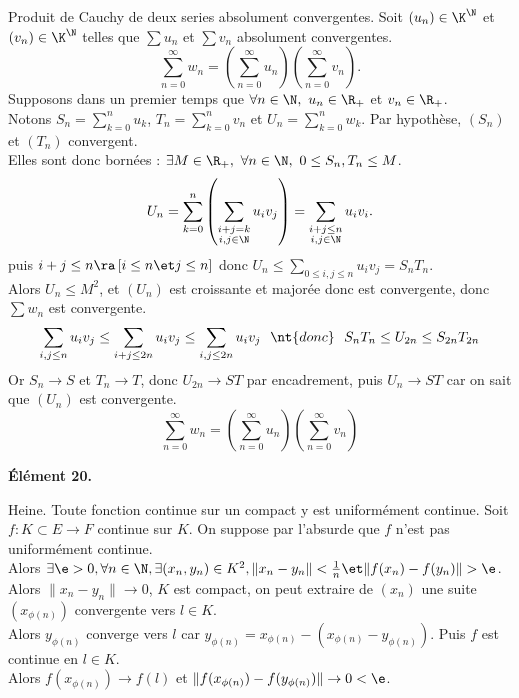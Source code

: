 \documentclass[11pt]{article}
\begin{document}
\begin{prop}{Produit de Cauchy de deux series absolument convergentes.}{}
    Soit $(u_n)\in\K^\N$ et $(v_n)\in\K^\N$ telles que $\sum u_n$ et $\sum v_n$ absolument convergentes.
    \begin{equation*}
        \sum_{n=0}^{\infty} w_n = \left( \sum_{n=0}^{\infty} u_n \right) \left( \sum_{n=0}^{\infty} v_n \right).
    \end{equation*}
    \tcblower
    Supposons dans un premier temps que $\forall n \in \N, ~ u_n \in \R_+$ et $v_n\in\R_+$.\\
    Notons $S_n=\sum_{k=0}^n u_k$, $T_n = \sum_{k=0}^n v_n$ et $U_n = \sum_{k=0}^n w_k$. Par hypothèse, $(S_n)$ et $(T_n)$ convergent.\\
    Elles sont donc bornées : $\exists M \in \R_+, ~ \forall n \in \N, ~ 0 \leq S_n, T_n \leq M$.
    \begin{equation*}
        U_n = \sum_{k=0}^n\left( \sum_{\substack{i+j=k\\i,j\in\N}} u_iv_j \right)=\sum_{\substack{i+j\leq n\\i,j\in\N}}u_iv_i.
    \end{equation*}
    puis $i+j\leq n \ra \left[ i \leq n \et j \leq n \right]$ donc $U_n \leq \sum_{0\leq i,j \leq n}u_iv_j=S_nT_n$.\\
    Alors $U_n \leq M^2$, et $(U_n)$ est croissante et majorée donc est convergente, donc $\sum w_n$ est convergente.
    \begin{equation*}
        \sum_{i,j\leq n}u_i v_j \leq \sum_{i+j\leq 2n}u_iv_j \leq \sum_{i,j\leq 2n}u_iv_j ~~\nt{donc}~~ S_nT_n \leq U_{2n} \leq S_{2n}T_{2n}
    \end{equation*}
    Or $S_n\to S$ et $T_n\to T$, donc $U_{2n}\to ST$ par encadrement, puis $U_n\to ST$ car on sait que $(U_n)$ est convergente.
    \begin{equation*}
        \sum_{n=0}^\infty w_n = \left( \sum_{n=0}^\infty u_n \right)\left( \sum_{n=0}^\infty v_n \right)
    \end{equation*}
\end{prop}

\bf{Élément 20.}

\begin{thm}{Heine.}{}
    Toute fonction continue sur un compact y est uniformément continue.
    \tcblower
    Soit $f:K\subset E\to F$ continue sur $K$. On suppose par l'absurde que $f$ n'est pas uniformément continue.\\
    Alors $\exists \e > 0, \forall n \in \N, \exists(x_n,y_n)\in K^2, \|x_n-y_n\|<\frac{1}{n} \et \|f(x_n)-f(y_n)\|>\e$.\\
    Alors $\|x_n-y_n\|\to0$, $K$ est compact, on peut extraire de $(x_n)$ une suite $(x_{\phi(n)})$ convergente vers $l\in K$.\\
    Alors $y_{\phi(n)}$ converge vers $l$ car $y_{\phi(n)}=x_{\phi(n)}-(x_{\phi(n)}-y_{\phi(n)})$. Puis $f$ est continue en $l\in K$.\\
    Alors $f(x_{\phi(n)})\to f(l)$ et $\|f(x_{\phi(n)}) - f(y_{\phi(n)})\| \to 0 < \e$.
\end{thm}
\end{document}
